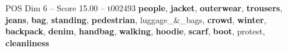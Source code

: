 \begin{textsample}{POS Dim 6 – Score 15.00 – t002493}  \label{ex:f6_pos_029}
\textbf{people}, \textbf{jacket}, \textbf{outerwear}, \textbf{trousers}, \textbf{jeans}, \textbf{bag}, \textbf{standing}, \textbf{pedestrian}, luggage\_\&\_bags, \textbf{crowd}, \textbf{winter}, \textbf{backpack}, \textbf{denim}, \textbf{handbag}, \textbf{walking}, \textbf{hoodie}, \textbf{scarf}, \textbf{boot}, protest, \textbf{cleanliness}

\end{textsample}
